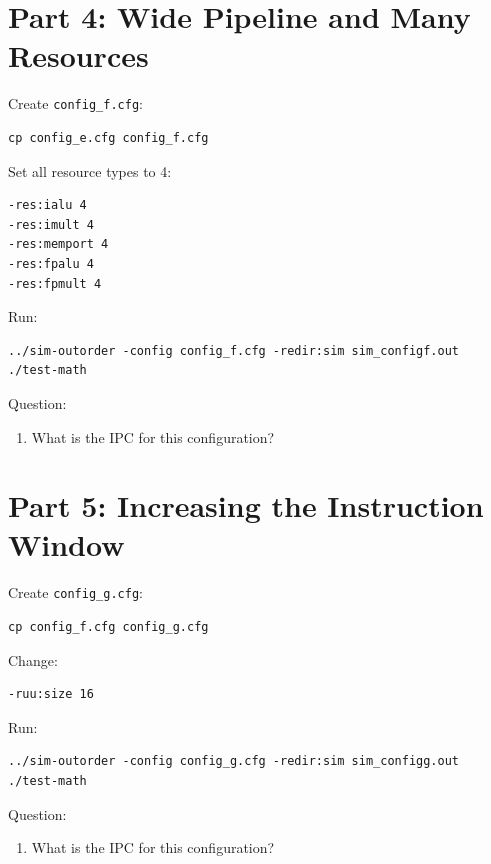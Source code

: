 \documentclass[11pt]{article}
\begin{document}
\section{Part 4: Wide Pipeline and Many Resources}
Create \texttt{config\_f.cfg}:
\begin{lstlisting}
cp config_e.cfg config_f.cfg
\end{lstlisting}
Set all resource types to 4:
\begin{lstlisting}
-res:ialu 4
-res:imult 4
-res:memport 4
-res:fpalu 4
-res:fpmult 4
\end{lstlisting}
Run:
\begin{lstlisting}
../sim-outorder -config config_f.cfg -redir:sim sim_configf.out ./test-math
\end{lstlisting}
Question:
\begin{enumerate}
\item What is the IPC for this configuration?
\end{enumerate}
\section{Part 5: Increasing the Instruction Window}
Create \texttt{config\_g.cfg}:
\begin{lstlisting}
cp config_f.cfg config_g.cfg
\end{lstlisting}
Change:
\begin{lstlisting}
-ruu:size 16
\end{lstlisting}
Run:
\begin{lstlisting}
../sim-outorder -config config_g.cfg -redir:sim sim_configg.out ./test-math
\end{lstlisting}
Question:
\begin{enumerate}
\item What is the IPC for this configuration?
\end{enumerate}
\end{document}
